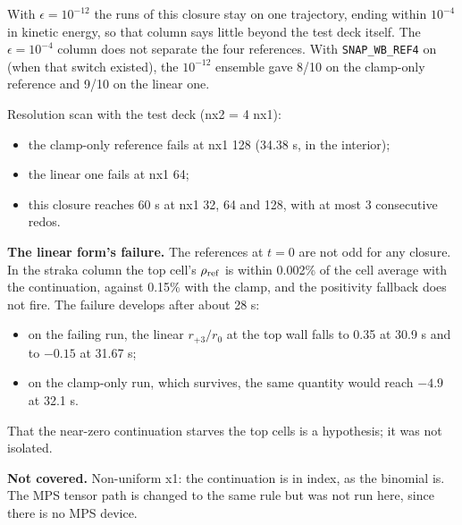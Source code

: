 \documentclass[11pt,a4paper]{article}
\begin{document}
With $\epsilon = 10^{-12}$ the runs of this closure stay on one trajectory, ending within $10^{-4}$ in kinetic
energy, so that column says little beyond the test deck itself. The $\epsilon = 10^{-4}$ column does not separate
the four references. With \texttt{SNAP\_WB\_REF4} on (when that switch existed), the $10^{-12}$ ensemble gave 8/10 on the clamp-only reference and
9/10 on the linear one.

Resolution scan with the test deck (nx2 = 4 nx1):
\begin{itemize}
\item the clamp-only reference fails at nx1 128 (34.38 s, in the interior);
\item the linear one fails at nx1 64;
\item this closure reaches 60 s at nx1 32, 64 and 128, with at most 3 consecutive redos.
\end{itemize}

\textbf{The linear form's failure.} The references at $t = 0$ are not odd for any closure. In the straka column the top
cell's $\rho_{\rm ref}$ is within 0.002\% of the cell average with the continuation, against 0.15\% with the clamp,
and the positivity fallback does not fire. The failure develops after about 28 s:
\begin{itemize}
\item on the failing run, the linear $r_{+3}/r_0$ at the top wall falls to 0.35 at 30.9 s and to $-0.15$ at 31.67 s;
\item on the clamp-only run, which survives, the same quantity would reach $-4.9$ at 32.1 s.
\end{itemize}

That the near-zero continuation starves the top cells is a hypothesis; it was not isolated.

\textbf{Not covered.} Non-uniform x1: the continuation is in index, as the binomial is. The MPS tensor path is changed
to the same rule but was not run here, since there is no MPS device.
\end{document}

